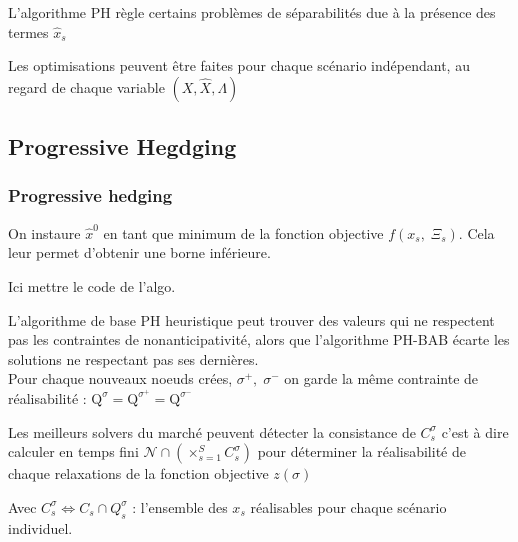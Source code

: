 \documentclass[10pt]{beamer}
\begin{document}
    \begin{frame}
        L'algorithme PH règle certains problèmes de séparabilités due à la présence des termes $\hat{x}_s$
    \end{frame}
    
    \begin{frame}
        Les optimisations peuvent être faites pour chaque scénario indépendant, au regard de chaque variable $(X, \hat{X}, \Lambda)$
    \end{frame}
    
    
    
    \subsection{Progressive Hegdging}  
    \begin{frame}
        \frametitle{Progressive hedging}
        On instaure $\hat{x}^0$ en tant que minimum de la fonction objective $f(x_s, \; \Xi_s)$. Cela leur permet d'obtenir une borne inférieure.
    \end{frame}
    
    \begin{frame}
         Ici mettre le code de l'algo.
    \end{frame}
    
    \begin{frame}
       L'algorithme de base PH heuristique peut trouver des valeurs qui ne respectent pas les contraintes de nonanticipativité, alors que l'algorithme PH-BAB écarte les solutions ne respectant pas ses dernières.\\
       Pour chaque nouveaux noeuds crées, $\sigma^+,\;\sigma^-$ on garde la même contrainte de réalisabilité : $\mathrm{Q}^\sigma = \mathrm{Q}^{\sigma^+} = \mathrm{Q}^{\sigma^-}$
    \end{frame}
    
    \begin{frame}
      Les meilleurs solvers du marché peuvent détecter la consistance de $C_s^\sigma$ c'est à dire calculer en temps fini 
      $\mathcal{N}\cap(\times_{s = 1}^S C_s^\sigma)$ pour déterminer la réalisabilité de chaque relaxations de la fonction objective $z(\sigma)$
      
      Avec $C_s^\sigma \Leftrightarrow C_s \cap Q_s^\sigma$ : l'ensemble des $x_s$ réalisables pour chaque scénario individuel.
    \end{frame}
    
\end{document}
